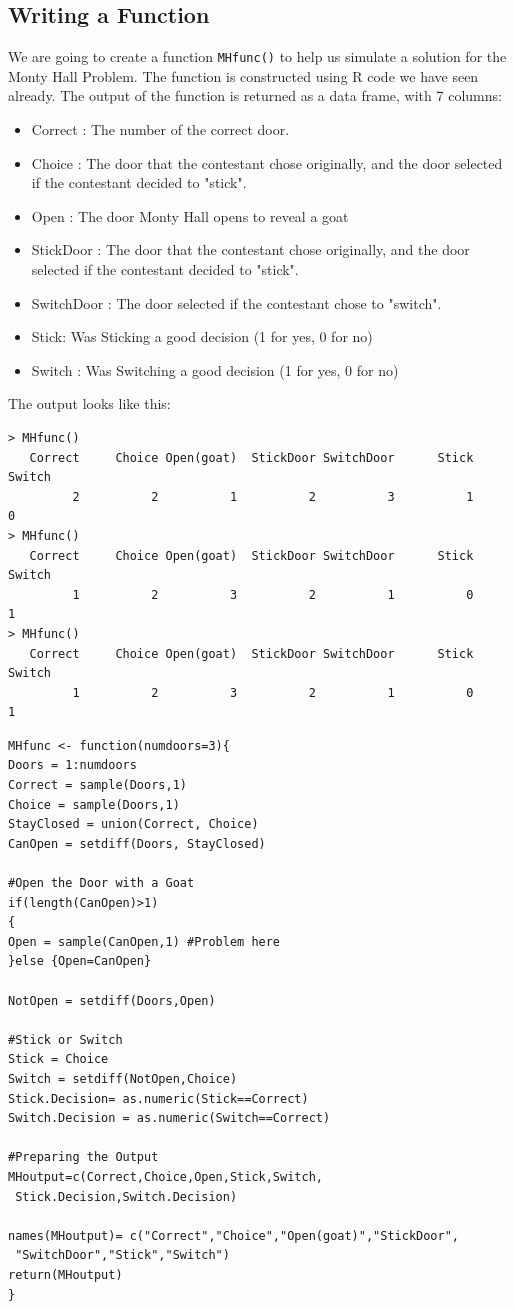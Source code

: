 \documentclass[11pt]{article} %
\begin{document}
\newpage
\subsection{ Writing a Function}
We are going to create a function \texttt{MHfunc()} to help us simulate a solution for the Monty Hall Problem. The function is constructed using R code we have seen already. The output of the
function is returned as a data frame, with 7 columns:

\begin{itemize}
\item Correct : The number of the correct door.
\item Choice : The door that the contestant chose originally, and the door selected if the contestant decided to "stick".
\item Open : The door Monty Hall opens to reveal a goat
\item StickDoor : The door that the contestant chose originally, and the door selected if the contestant decided to "stick".
\item SwitchDoor : The door selected if the contestant chose to "switch".
\item Stick: Was Sticking a good decision (1 for yes, 0 for no)
\item Switch : Was Switching a good decision (1 for yes, 0 for no)
\end{itemize}
The output looks like this:
\begin{verbatim}
> MHfunc()
   Correct     Choice Open(goat)  StickDoor SwitchDoor      Stick     Switch 
         2          2          1          2          3          1          0 
> MHfunc()
   Correct     Choice Open(goat)  StickDoor SwitchDoor      Stick     Switch 
         1          2          3          2          1          0          1 
> MHfunc()
   Correct     Choice Open(goat)  StickDoor SwitchDoor      Stick     Switch 
         1          2          3          2          1          0          1
\end{verbatim}

\newpage
\begin{framed}
\begin{verbatim}
MHfunc <- function(numdoors=3){
Doors = 1:numdoors
Correct = sample(Doors,1)
Choice = sample(Doors,1)
StayClosed = union(Correct, Choice)
CanOpen = setdiff(Doors, StayClosed)

#Open the Door with a Goat
if(length(CanOpen)>1)
{
Open = sample(CanOpen,1) #Problem here
}else {Open=CanOpen}

NotOpen = setdiff(Doors,Open)

#Stick or Switch
Stick = Choice
Switch = setdiff(NotOpen,Choice)
Stick.Decision= as.numeric(Stick==Correct)
Switch.Decision = as.numeric(Switch==Correct)

#Preparing the Output
MHoutput=c(Correct,Choice,Open,Stick,Switch,
 Stick.Decision,Switch.Decision)

names(MHoutput)= c("Correct","Choice","Open(goat)","StickDoor",
 "SwitchDoor","Stick","Switch")
return(MHoutput)
}
\end{verbatim}
\end{framed}
\end{document}
